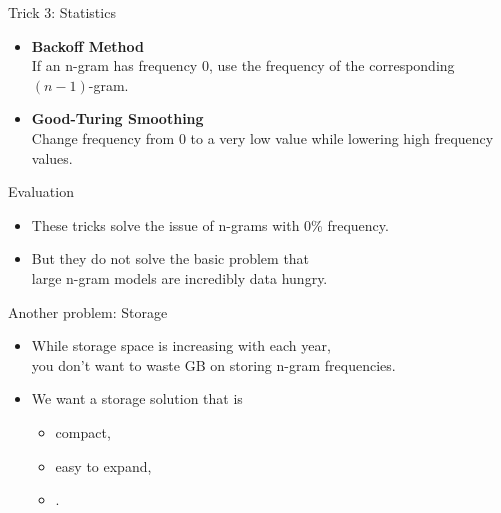 \documentclass[professionalfonts, xcolor={usenames,svgnames,x11names,table}]{beamer}
\begin{document}
\begin{frame}{Trick 3: Statistics}
    \begin{itemize}
        \item \textbf{Backoff Method}\\
            If an n-gram has frequency $0$, use the frequency of the corresponding $(n-1)$-gram.
        \item \textbf{Good-Turing Smoothing}\\
            Change frequency from $0$ to a very low value while lowering high frequency values.
    \end{itemize}

    \begin{block}{Evaluation}
        \begin{itemize}
            \item These tricks solve the issue of n-grams with 0\% frequency.
            \item But they do not solve the basic problem that\\
                  large n-gram models are incredibly data hungry.
        \end{itemize}
    \end{block}
\end{frame}

\begin{frame}{Another problem: Storage}
    \begin{itemize}
        \item While storage space is increasing with each year,\\
              you don't want to waste GB on storing n-gram frequencies.
        \item We want a storage solution that is
                \begin{itemize}
                    \item compact,
                    \item easy to expand,
                    \item {}.
                \end{itemize}
    \end{itemize}
\end{frame}
\end{document}
